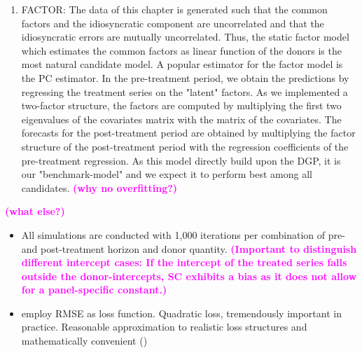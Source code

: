 \begin{enumerate}
	\item FACTOR: The data of this chapter is generated such that the common factors and the idiosyncratic component are uncorrelated and that the idiosyncratic errors are mutually uncorrelated. Thus, the static factor model which estimates the common factors as linear function of the donors is the most natural candidate model.  A popular estimator for the factor model is the \ac{PC} estimator. In the pre-treatment period, we obtain the predictions by regressing the treatment series on the "latent" factors. As we implemented a two-factor structure, the factors are computed by multiplying the first two eigenvalues of the covariates matrix with the matrix of the covariates. The forecasts for the post-treatment period are obtained by multiplying the factor structure of the post-treatment period with the regression coefficients of the pre-treatment regression. As this model directly build upon the \ac{DGP}, it is our "benchmark-model" and we expect it to perform best among all candidates. 
	\textcolor{magenta}{\textbf{(why no overfitting?)}} 
\end{enumerate}
\textcolor{magenta}{\textbf{(what else?)}} 



\begin{itemize}
	\item All simulations are conducted with 1,000 iterations per combination of pre- and post-treatment horizon and donor quantity. \textcolor{magenta}{\textbf{(Important to distinguish different intercept cases: If the intercept of the treated series falls outside the donor-intercepts, SC exhibits a bias as it does not allow for a panel-specific constant.)}} 
	\item employ RMSE as loss function. Quadratic loss, tremendously important in practice. Reasonable approximation to realistic loss structures and mathematically convenient (\cite{diebold:2017})
\end{itemize}


